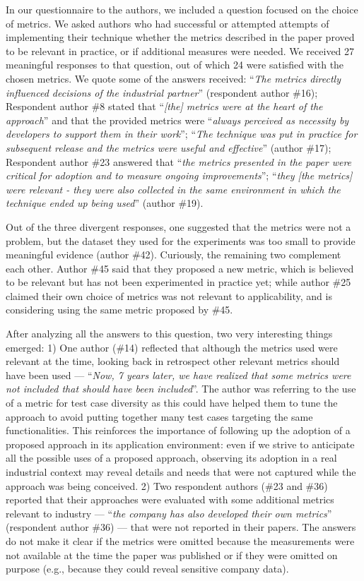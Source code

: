 

In our questionnaire to the authors, we included a question focused on the choice of metrics.
We asked authors who had successful or attempted attempts of implementing their technique whether the metrics described in the paper proved to be relevant in practice, or if additional measures were needed.
%
We received 27 meaningful responses to that question, out of which 24 were satisfied with the chosen metrics.
We quote some of the answers received:
``\textit{The metrics directly influenced decisions of the industrial partner}'' (respondent author \#16);
%
Respondent author \#8 stated that 
``\textit{[the] metrics were at the heart of the approach}'' 
and that the provided metrics were 
``\textit{always perceived as necessity by developers to support them in their work}'';
%
 ``\textit{The technique was put in practice for subsequent release and the metrics were useful and effective}'' (author \#17);
%
Respondent author \#23 answered that ``\textit{the metrics presented in the paper were critical for adoption and to measure ongoing improvements}'';
``\textit{they [the metrics] were relevant - they were also collected in the same environment in which the technique ended up being used}'' (author \#19).

Out of the three divergent responses, one suggested that the metrics were not a problem, but the dataset they used for the experiments was too small to provide meaningful evidence (author \#42).
Curiously, the remaining two complement each other. 
Author \#45 said that they proposed a new metric, which is believed to be relevant but has not been experimented in practice yet; while author \#25 claimed their own choice of metrics was not relevant to applicability, and is considering using the same metric proposed by \#45.


After analyzing all the answers to this question, two very interesting things emerged:
1) One author (\#14) reflected that although the metrics used were relevant at the time, looking back in retrospect other relevant metrics should have been used --- 
``\textit{Now, 7 years later, we have realized that some metrics were not included that should have been included}''.
The author was referring to the use of a metric for test case diversity as this could have helped them to tune the approach to avoid putting together many test cases targeting the same functionalities.
This reinforces the importance of following up the adoption of a proposed approach in its application environment:
even if we strive to anticipate all the possible uses of a proposed approach, observing its adoption in a real industrial context may reveal details and needs that were not captured while the approach was being conceived.
2) Two respondent authors (\#23 and \#36) reported that their approaches were evaluated with some additional metrics relevant to industry --- ``\textit{the company has also developed their own metrics}'' (respondent author \#36) --- that were not reported in their papers.
The answers do not make it clear if the metrics were omitted because the measurements were not available at the time the paper was published or if they were omitted on purpose (e.g., because they could reveal sensitive company data).

